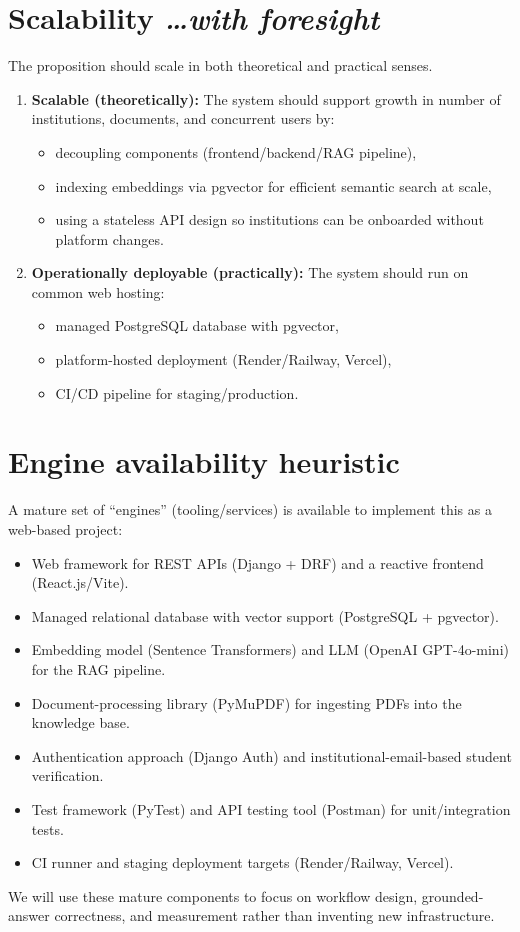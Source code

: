 \documentclass[11pt,a4paper]{article}
\newcommand{\BvrHint}[1]{%
  {\normalfont\normalsize\itshape\hfill #1}}
\begin{document}
\section{Scalability %
\BvrHint{\ldots with foresight}}
The proposition should scale in both theoretical and practical senses.

\begin{enumerate}[leftmargin=0.7cm]
    \item \textbf{Scalable (theoretically):} The system should support growth in number of institutions, documents, and concurrent users by:
    \begin{itemize}[leftmargin=0.7cm]
        \item decoupling components (frontend/backend/RAG pipeline),
        \item indexing embeddings via pgvector for efficient semantic search at scale,
        \item using a stateless API design so institutions can be onboarded without platform changes.
    \end{itemize}

    \item \textbf{Operationally deployable (practically):} The system should run on common web hosting:
    \begin{itemize}[leftmargin=0.7cm]
        \item managed PostgreSQL database with pgvector,
        \item platform-hosted deployment (Render/Railway, Vercel),
        \item CI/CD pipeline for staging/production.
    \end{itemize}
\end{enumerate}

\section{Engine availability heuristic}
A mature set of ``engines'' (tooling/services) is available to
implement this as a web-based project:
\begin{itemize}[leftmargin=0.7cm]
    \item Web framework for REST APIs (Django + DRF) and a reactive frontend (React.js/Vite).
    \item Managed relational database with vector support (PostgreSQL + pgvector).
    \item Embedding model (Sentence Transformers) and LLM (OpenAI GPT-4o-mini) for the RAG pipeline.
    \item Document-processing library (PyMuPDF) for ingesting PDFs into the knowledge base.
    \item Authentication approach (Django Auth) and institutional-email-based student verification.
    \item Test framework (PyTest) and API testing tool (Postman) for unit/integration tests.
    \item CI runner and staging deployment targets (Render/Railway, Vercel).
\end{itemize}
We will use these mature components to focus on workflow design,
grounded-answer correctness, and measurement rather than inventing new
infrastructure.
\end{document}
